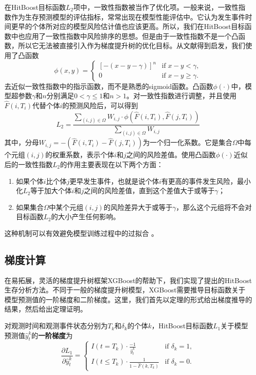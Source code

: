 在HitBoost目标函数$L_2$项中，一致性指数被当作了优化项。一般来说，一致性指数作为生存预测模型的评估指标，常常出现在模型性能评估中。它认为发生事件时间更早的个体所对应的模型风险估计值也应该更高。所以，我们在HitBoost目标函数中也应用了一致性指数中风险排序的思想。但是由于一致性指数不是一个凸函数，所以它无法被直接引入作为梯度提升树的优化目标。从文献\cite{Yan2004pre}得到启发，我们使用了凸函数
\begin{equation}
\phi(x,y)=
\begin{cases}
{[-(x-y-\gamma)]}^n & \text{if } x-y < \gamma,\\
0 & \text{if } x-y \ge \gamma.
\end{cases}
\end{equation}
去近似一致性指数中的指示函数，而不是熟悉的sigmoid函数。凸函数$\phi(\cdot)$中，模型超参数$\gamma$和$n$分别满足$0<\gamma \le 1$和$n>1$。对一致性指数进行调整，并且使用$\hat{F}(i, T_i)$代替个体$i$的预测风险后，可以得到
\begin{equation}
L_2 = \frac{\sum_{(i,j)\in \Omega} W_{i,j}\cdot \phi(\hat{F}(i, T_i), \hat{F}(j, T_i))}{\sum_{(i,j)\in \Omega} W_{i,j}}
\end{equation}
其中，分母$W_{i,j}=-\left( \hat{F}(i, T_i) - \hat{F}(j, T_i) \right)$为一个归一化系数。它是集合$\Omega$中每个元组$(i,j)$的权重系数，表示个体$i$和$j$之间的风险差值。使用凸函数$\phi(\cdot)$近似后的一致性指数$L_2$的作用主要表现在以下两个方面：
\begin{enumerate}
    \item 如果个体$i$比个体$j$更早发生事件，也就是说个体$i$有更高的事件发生风险，最小化$L_2$等于加大个体$i$和$j$之间的风险差值，直到这个差值大于或等于$\gamma$；
    \item 如果集合$\Omega$中某个元组$(i,j)$的风险差异大于或等于$\gamma$，那么这个元组将不会对目标函数$L_2$的大小产生任何影响。
\end{enumerate}
这种机制可以有效避免模型训练过程中的过拟合 。

\subsection{梯度计算}

在易拓展，灵活的梯度提升树框架XGBoost的帮助下，我们实现了提出的HitBoost生存分析方法。不同于一般的梯度提升树模型，XGBoost需要推导目标函数关于模型预测值的一阶梯度和二阶梯度。这里，我们首先以定理的形式给出梯度推导的结果，然后给出定理证明。

\begin{theorem}\label{thm:1.1}
对观测时间和观测事件状态分别为$T_k$和$\delta_k$的个体$k$，HitBoost目标函数$L_1$关于模型预测值$\hat{y}_t^k$的\textbf{一阶梯度}为$$
\frac{\partial L_1}{\partial \hat{y}_t^k}=
\begin{cases}
I(t=T_k)\cdot \frac{-1}{\hat{y}_t^k} & \text{if } \delta_k = 1,\\
I(t\le T_k)\cdot \frac{1}{1-\hat{F}(k, T_k)} & \text{if } \delta_k = 0.
\end{cases}
$$
\end{theorem}

